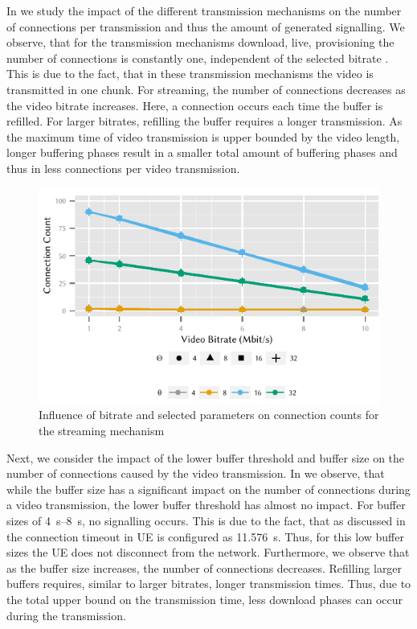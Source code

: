 In  we study the impact of the different transmission mechanisms on the number of connections per transmission and thus the amount of generated signalling.
We observe, that for the transmission mechanisms download, live, provisioning the number of connections is constantly one, independent of the selected bitrate \bitrate.
This is due to the fact, that in these transmission mechanisms the video is transmitted in one chunk.
For streaming, the number of connections decreases as the video bitrate increases.
Here, a connection occurs each time the buffer is refilled.
For larger bitrates, refilling the buffer requires a longer transmission.
As the maximum time of video transmission is upper bounded by the video length, longer buffering phases result in a smaller total amount of buffering phases and thus in less connections per video transmission.

\begin{figure}
  \centering
  \includegraphics{application/lte_video/numerical_evaluation/figures/bitrate2connections_parameters}
  \caption{Influence of bitrate and selected parameters on connection counts for the streaming mechanism}
  \label{fig:application:lte_video:numerical_evaluation:energy_consumption:bitrate2connections_parameters}
\end{figure}

Next, we consider the impact of the lower buffer threshold \bufferlower and buffer size \buffersize on the number of connections \connectioncount caused by the video transmission.
In  we observe, that while the buffer size has a significant impact on the number of connections during a video transmission, the lower buffer threshold has almost no impact.
For buffer sizes of \SIrange{4}{8}{\second}, no signalling occurs.
This is due to the fact, that as discussed in  the connection timeout in \gls{UE} is configured as \SI{11.576}{\second}.
Thus, for this low buffer sizes the \gls{UE} does not disconnect from the network.
Furthermore, we observe that as the buffer size increases, the number of connections decreases.
Refilling larger buffers requires, similar to larger bitrates, longer transmission times.
Thus, due to the total upper bound on the transmission time, less download phases can occur during the transmission.